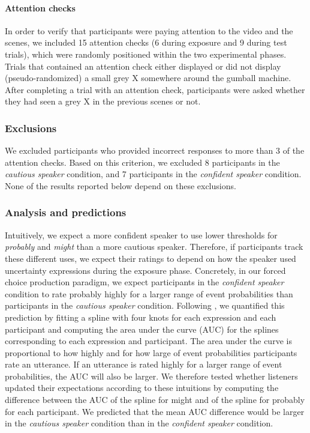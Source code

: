 \documentclass[man, floatsintext]{apa6}
\begin{document}
\paragraph{Attention checks}  In order to verify that participants were paying attention to the video and the scenes, we included 15 attention checks (6 during exposure and 9 during test trials), which were randomly positioned within the two experimental phases. Trials that contained an attention check either displayed or did not display (pseudo-randomized) a small grey X somewhere around the gumball machine. After completing a trial with an attention check, participants were asked whether they had seen a grey X in the previous scenes or not.

\subsubsection{Exclusions} We excluded participants who provided incorrect responses to more than 3 of the attention checks. Based on this criterion, we excluded 8 participants in the \textit{cautious speaker} condition, and 7 participants in the \textit{confident speaker} condition. None of the results reported below depend on these exclusions.


\subsubsection{Analysis and predictions}  

Intuitively, we expect a more confident speaker to use lower thresholds for {\it probably} and {\it might} than a more cautious speaker.
Therefore, if participants track these different uses, we expect their ratings to depend on how the speaker used uncertainty expressions during the exposure phase. 
Concretely,  in our forced choice production paradigm, we expect participants in the \textit{confident speaker} condition to rate {\sc probably} highly for a larger range of event probabilities than participants
in the \textit{cautious speaker} condition. 
Following \cite{Yildirim2016}, we quantified this prediction by fitting a spline with four knots for each expression and each participant and computing the area 
under the curve (AUC) for the splines corresponding to each expression and participant. The area under the curve is proportional to how highly and for how large 
of event probabilities participants rate an utterance. If an utterance is rated highly for a larger range of event probabilities, the AUC will also be larger. 
We therefore tested whether listeners updated their expectations according to these intuitions by computing the difference between the AUC of the spline for 
{\sc might} and of the spline for {\sc probably} for each participant. We predicted that the mean AUC difference would be larger in the 
\emph{cautious speaker} condition than in the \emph{confident speaker} condition.
\end{document}
